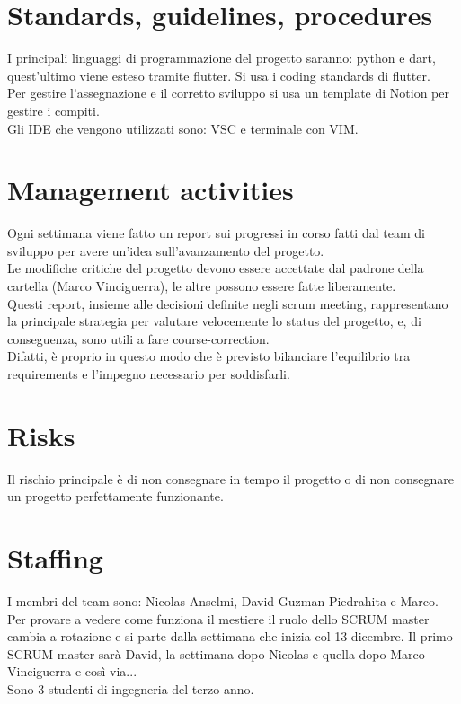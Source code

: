\documentclass{article}
\begin{document}
\section{Standards, guidelines, procedures}
I principali linguaggi di programmazione del progetto saranno: python e dart, quest'ultimo
viene esteso tramite flutter.
Si usa i coding standards di flutter.
\\Per gestire l'assegnazione e il corretto sviluppo si usa un template di Notion per gestire i compiti.
\\Gli IDE che vengono utilizzati sono: VSC e terminale con VIM.

\section{Management activities}
Ogni settimana viene fatto un report sui progressi in corso fatti dal team di sviluppo per avere un'idea sull'avanzamento del progetto.
\\Le modifiche critiche del progetto devono essere accettate dal padrone della cartella (Marco Vinciguerra), le altre possono essere fatte 
liberamente.
\\Questi report, insieme alle decisioni definite negli scrum meeting, rappresentano la principale strategia per valutare velocemente lo status del progetto, e, 
di conseguenza, sono utili a fare course-correction.
\\Difatti, è proprio in questo modo che è previsto bilanciare l’equilibrio tra requirements e l’impegno necessario per soddisfarli.  
\section{Risks}
Il rischio principale è di non consegnare in tempo il progetto o di non consegnare un progetto perfettamente funzionante.
\section{Staffing}
I membri del team sono: Nicolas Anselmi, David Guzman Piedrahita e Marco.
\\Per provare a vedere come funziona il mestiere il ruolo dello SCRUM master cambia a rotazione e si parte dalla settimana 
che inizia col 13 dicembre. Il primo SCRUM master sarà David, la settimana dopo Nicolas e quella dopo Marco Vinciguerra e così via...
\\Sono 3 studenti di ingegneria del terzo anno.
\end{document}
